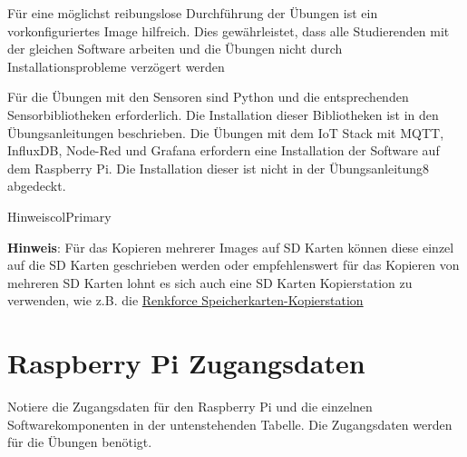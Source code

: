\documentclass[
  11pt,
  a4paper,
  oneside, openany  ,captions=tableheading
]{scrbook}
\theoremstyle{remark}
\begin{document}
Für eine möglichst reibungslose Durchführung der Übungen ist ein
vorkonfiguriertes Image hilfreich. Dies gewährleistet, dass alle
Studierenden mit der gleichen Software arbeiten und die Übungen nicht
durch Installationsprobleme verzögert werden

Für die Übungen mit den Sensoren sind Python und die entsprechenden
Sensorbibliotheken erforderlich. Die Installation dieser Bibliotheken
ist in den Übungsanleitungen beschrieben. Die Übungen mit dem IoT Stack
mit MQTT, InfluxDB, Node-Red und Grafana erfordern eine Installation der
Software auf dem Raspberry Pi. Die Installation dieser ist nicht in der
Übungsanleitung8 abgedeckt.

\begin{boxtitle}{Hinweis}{colPrimary}

\textbf{Hinweis}: Für das Kopieren mehrerer Images auf SD Karten können
diese einzel auf die SD Karten geschrieben werden oder empfehlenswert
für das Kopieren von mehreren SD Karten lohnt es sich auch eine SD
Karten Kopierstation zu verwenden, wie z.B. die
\href{https://www.digitec.ch/de/s1/product/renkforce-tragbares-sdmicrosd-flash-lesegeraet-mit-kopierfunktion-v-1-auf-2-von-speicherkartenlesege-14550270}{Renkforce
Speicherkarten-Kopierstation}

\end{boxtitle}

\section{Raspberry Pi Zugangsdaten}\label{raspberry-pi-zugangsdaten}

Notiere die Zugangsdaten für den Raspberry Pi und die einzelnen
Softwarekomponenten in der untenstehenden Tabelle. Die Zugangsdaten
werden für die Übungen benötigt.
\end{document}
